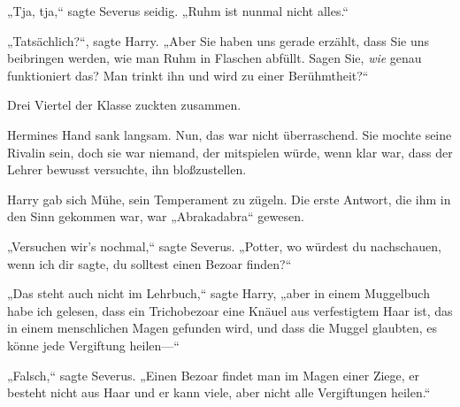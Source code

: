 „Tja, tja,“ sagte Severus seidig. „Ruhm ist nunmal nicht alles.“

„Tatsächlich?“, sagte Harry. „Aber Sie haben uns gerade erzählt, dass Sie uns beibringen werden, wie man Ruhm in Flaschen abfüllt. Sagen Sie, \emph{wie} genau funktioniert das? Man trinkt ihn und wird zu einer Berühmtheit?“

Drei Viertel der Klasse zuckten zusammen.

Hermines Hand sank langsam. Nun, das war nicht überraschend. Sie mochte seine Rivalin sein, doch sie war niemand, der mitspielen würde, wenn klar war, dass der Lehrer bewusst versuchte, ihn bloßzustellen.

Harry gab sich Mühe, sein Temperament zu zügeln. Die erste Antwort, die ihm in den Sinn gekommen war, war „Abrakadabra“ gewesen.

„Versuchen wir’s nochmal,“ sagte Severus. „Potter, wo würdest du nachschauen, wenn ich dir sagte, du solltest einen Bezoar finden?“

„Das steht auch nicht im Lehrbuch,“ sagte Harry, „aber in einem Muggelbuch habe ich gelesen, dass ein Trichobezoar eine Knäuel aus verfestigtem Haar ist, das in einem menschlichen Magen gefunden wird, und dass die Muggel glaubten, es könne jede Vergiftung heilen—“

„Falsch,“ sagte Severus. „Einen Bezoar findet man im Magen einer Ziege, er besteht nicht aus Haar und er kann viele, aber nicht alle Vergiftungen heilen.“

